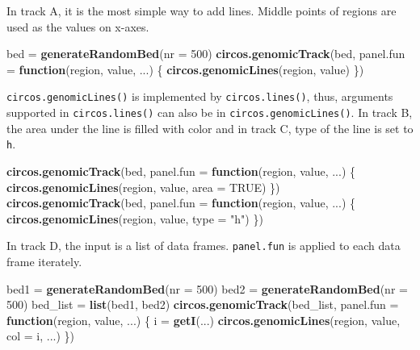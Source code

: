 \documentclass[]{book}
\newenvironment{Shaded}{\begin{snugshade}}{\end{snugshade}}
\newcommand{\KeywordTok}[1]{\textcolor[rgb]{0.13,0.29,0.53}{\textbf{#1}}}
\newcommand{\DataTypeTok}[1]{\textcolor[rgb]{0.13,0.29,0.53}{#1}}
\newcommand{\DecValTok}[1]{\textcolor[rgb]{0.00,0.00,0.81}{#1}}
\newcommand{\StringTok}[1]{\textcolor[rgb]{0.31,0.60,0.02}{#1}}
\newcommand{\OtherTok}[1]{\textcolor[rgb]{0.56,0.35,0.01}{#1}}
\newcommand{\ControlFlowTok}[1]{\textcolor[rgb]{0.13,0.29,0.53}{\textbf{#1}}}
\newcommand{\NormalTok}[1]{#1}
\begin{document}
In track A, it is the most simple way to add lines. Middle points of
regions are used as the values on x-axes.

\begin{Shaded}
\begin{Highlighting}[]
\NormalTok{bed =}\StringTok{ }\KeywordTok{generateRandomBed}\NormalTok{(}\DataTypeTok{nr =} \DecValTok{500}\NormalTok{)}
\KeywordTok{circos.genomicTrack}\NormalTok{(bed, }
    \DataTypeTok{panel.fun =} \ControlFlowTok{function}\NormalTok{(region, value, ...) \{}
        \KeywordTok{circos.genomicLines}\NormalTok{(region, value)}
\NormalTok{\})}
\end{Highlighting}
\end{Shaded}

\texttt{circos.genomicLines()} is implemented by
\texttt{circos.lines()}, thus, arguments supported in
\texttt{circos.lines()} can also be in \texttt{circos.genomicLines()}.
In track B, the area under the line is filled with color and in track C,
type of the line is set to \texttt{h}.

\begin{Shaded}
\begin{Highlighting}[]
\KeywordTok{circos.genomicTrack}\NormalTok{(bed, }
    \DataTypeTok{panel.fun =} \ControlFlowTok{function}\NormalTok{(region, value, ...) \{}
        \KeywordTok{circos.genomicLines}\NormalTok{(region, value, }\DataTypeTok{area =} \OtherTok{TRUE}\NormalTok{)}
\NormalTok{\})}
\KeywordTok{circos.genomicTrack}\NormalTok{(bed, }
    \DataTypeTok{panel.fun =} \ControlFlowTok{function}\NormalTok{(region, value, ...) \{}
        \KeywordTok{circos.genomicLines}\NormalTok{(region, value, }\DataTypeTok{type =} \StringTok{"h"}\NormalTok{)}
\NormalTok{\})}
\end{Highlighting}
\end{Shaded}

In track D, the input is a list of data frames. \texttt{panel.fun} is
applied to each data frame iterately.

\begin{Shaded}
\begin{Highlighting}[]
\NormalTok{bed1 =}\StringTok{ }\KeywordTok{generateRandomBed}\NormalTok{(}\DataTypeTok{nr =} \DecValTok{500}\NormalTok{)}
\NormalTok{bed2 =}\StringTok{ }\KeywordTok{generateRandomBed}\NormalTok{(}\DataTypeTok{nr =} \DecValTok{500}\NormalTok{)}
\NormalTok{bed_list =}\StringTok{ }\KeywordTok{list}\NormalTok{(bed1, bed2)}
\KeywordTok{circos.genomicTrack}\NormalTok{(bed_list, }
    \DataTypeTok{panel.fun =} \ControlFlowTok{function}\NormalTok{(region, value, ...) \{}
\NormalTok{        i =}\StringTok{ }\KeywordTok{getI}\NormalTok{(...)}
        \KeywordTok{circos.genomicLines}\NormalTok{(region, value, }\DataTypeTok{col =}\NormalTok{ i, ...)}
\NormalTok{\})}
\end{Highlighting}
\end{Shaded}
\end{document}
